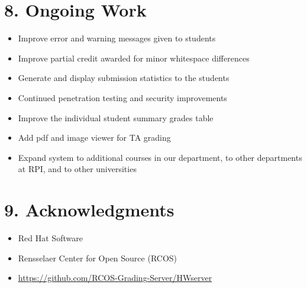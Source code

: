 \documentclass[thesis]{hmcposter}
\begin{document}
\begin{poster}
\section{8. Ongoing Work}%
\begin{itemize}
    \item Improve error and warning messages given to students
    \item Improve partial credit awarded for minor whitespace differences
    \item Generate and display submission statistics to the students
    \item Continued penetration testing and security improvements
    \item Improve the individual student summary grades table 
    \item Add pdf and image viewer for TA grading
    \item Expand system to additional courses in our department, to
      other departments at RPI, and to other universities
\end{itemize}

\section{9. Acknowledgments}
\begin{itemize}
    \item Red Hat Software
    \item Rensselaer Center for Open Source (RCOS)
    \item  \url{https://github.com/RCOS-Grading-Server/HWserver}
\end{itemize}

\end{poster}
\end{document}
